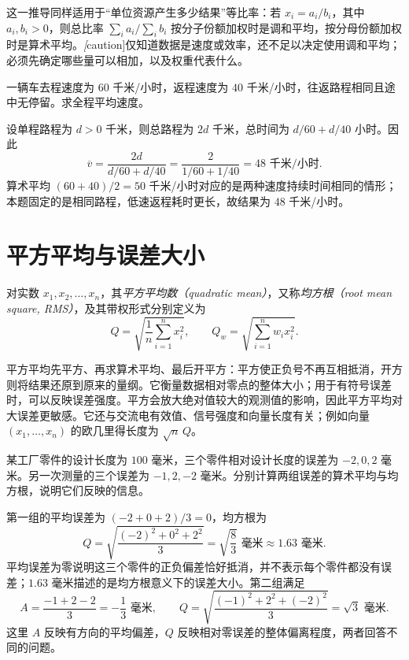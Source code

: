 \documentclass[UTF8,12pt,a4paper,fontset=fandol]{ctexart}
\begin{document}
这一推导同样适用于“单位资源产生多少结果”等比率：若 $x_i=a_i/b_i$，其中 $a_i,b_i>0$，则总比率 $\sum_i a_i/\sum_i b_i$ 按分子份额加权时是调和平均，按分母份额加权时是算术平均。\emph[caution]{仅知道数据是速度或效率，还不足以决定使用调和平均；必须先确定哪些量可以相加，以及权重代表什么。}

\begin{example}
一辆车去程速度为 $60$ 千米/小时，返程速度为 $40$ 千米/小时，往返路程相同且途中无停留。求全程平均速度。
\end{example}

\begin{solve}
设单程路程为 $d>0$ 千米，则总路程为 $2d$ 千米，总时间为 $d/60+d/40$ 小时。因此
\[
  \overline v=\frac{2d}{d/60+d/40}
  =\frac{2}{1/60+1/40}=48\text{ 千米/小时}.
\]
算术平均 $(60+40)/2=50$ 千米/小时对应的是两种速度持续时间相同的情形；本题固定的是相同路程，低速返程耗时更长，故结果为 $48$ 千米/小时。
\end{solve}

\section{平方平均与误差大小}
\label{sec:means-quadratic}

\begin{definition}
对实数 $x_1,x_2,\ldots,x_n$，其\emph{平方平均数（quadratic mean）}，又称\emph{均方根（root mean square, RMS）}，及其带权形式分别定义为
\begin{equation}
\label{eq:means-quadratic}
  Q=\sqrt{\frac{1}{n}\sum_{i=1}^n x_i^2},
  \qquad Q_w=\sqrt{\sum_{i=1}^n w_i x_i^2}.
\end{equation}
\end{definition}

平方平均先平方、再求算术平均、最后开平方：平方使正负号不再互相抵消，开方则将结果还原到原来的量纲。它衡量数据相对零点的整体大小；用于有符号误差时，可以反映误差强度。平方会放大绝对值较大的观测值的影响，因此平方平均对大误差更敏感。它还与交流电有效值、信号强度和向量长度有关；例如向量 $(x_1,\ldots,x_n)$ 的欧几里得长度为 $\sqrt n\,Q$。

\begin{example}
某工厂零件的设计长度为 $100$ 毫米，三个零件相对设计长度的误差为 $-2,0,2$ 毫米。另一次测量的三个误差为 $-1,2,-2$ 毫米。分别计算两组误差的算术平均与均方根，说明它们反映的信息。
\end{example}

\begin{solve}
第一组的平均误差为 $(-2+0+2)/3=0$，均方根为
\[
  Q=\sqrt{\frac{(-2)^2+0^2+2^2}{3}}
  =\sqrt{\frac83}\text{ 毫米}\approx1.63\text{ 毫米}.
\]
平均误差为零说明这三个零件的正负偏差恰好抵消，并不表示每个零件都没有误差；$1.63$ 毫米描述的是均方根意义下的误差大小。第二组满足
\[
  A=\frac{-1+2-2}{3}=-\frac13\text{ 毫米},
  \qquad Q=\sqrt{\frac{(-1)^2+2^2+(-2)^2}{3}}
  =\sqrt3\text{ 毫米}.
\]
这里 $A$ 反映有方向的平均偏差，$Q$ 反映相对零误差的整体偏离程度，两者回答不同的问题。
\end{solve}
\end{document}
